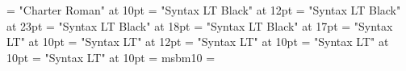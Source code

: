 
\font\bodyrm = "Charter Roman" at 10pt
\font\chaptocsf = "Syntax LT Black" at 12pt
\font\tisf = "Syntax LT Black" at 23pt
\font\ausf = "Syntax LT Black" at 18pt
\font\chaphdsf = "Syntax LT Black" at 17pt
\font\secttocsf = "Syntax LT" at 10pt
\font\twelvesf = "Syntax LT" at 12pt
\font\tensf = "Syntax LT" at 10pt
\font\secthdsf = "Syntax LT" at 10pt
\font\figsf = "Syntax LT" at 10pt
\font\tenbb = msbm10
\newfam\bbfam
\textfont\bbfam=\tenbb
